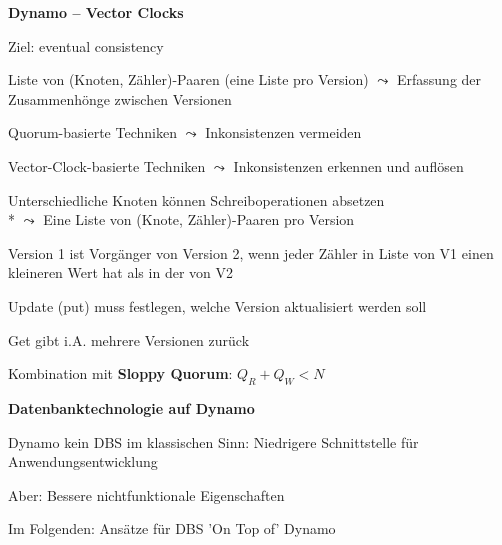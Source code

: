 \textbf{Dynamo -- Vector Clocks}
\begin{items}
	\item Ziel: eventual consistency
	\item Liste von (Knoten, Zähler)-Paaren (eine Liste pro Version) \( \leadsto \) Erfassung der Zusammenhönge zwischen Versionen
	\item Quorum-basierte Techniken \( \leadsto \) Inkonsistenzen vermeiden
	\item Vector-Clock-basierte Techniken \( \leadsto \) Inkonsistenzen erkennen und auflösen
	\item Unterschiedliche Knoten können Schreiboperationen absetzen \\* \( \leadsto \) Eine Liste von (Knote, Zähler)-Paaren pro Version
	\item Version 1 ist Vorgänger von Version 2, wenn jeder Zähler in Liste von V1 einen kleineren Wert hat als in der von V2
	\item Update (put) muss festlegen, welche Version aktualisiert werden soll
	\item Get gibt i.A. mehrere Versionen zurück
	\item Kombination mit \textbf{Sloppy Quorum}: \( Q_R+Q_W < N \)
\end{items}

\newpage

\textbf{Datenbanktechnologie auf Dynamo}
\begin{items}
	\item Dynamo kein DBS im klassischen Sinn: Niedrigere Schnittstelle für Anwendungsentwicklung
	\item Aber: Bessere nichtfunktionale Eigenschaften
	\item Im Folgenden: Ansätze für DBS 'On Top of' Dynamo
\end{items}

